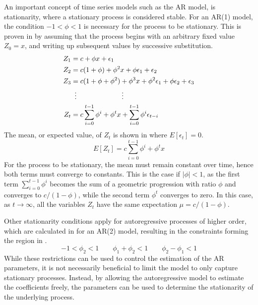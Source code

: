     An important concept of time series models such as the AR model, is stationarity, where a stationary process is considered stable. For an AR(1) model, the condition $-1<\phi<1$ is necessary for the process to be stationary. This is proven in \cite{alonso2012autoregressive} by assuming that the process begins with an arbitrary fixed value $Z_0=x$, and writing up subsequent values by successive substitution.
    \begin{equation}
        \begin{split}
            Z_1 & = c + \phi x + \epsilon_1 \\
            Z_2 & = c(1+\phi) + \phi^2x+\phi\epsilon_1 + \epsilon_2 \\
            Z_3 & = c(1+\phi+\phi^2) + \phi^3x + \phi^2\epsilon_1 + \phi\epsilon_2 + \epsilon_3 \\
            & \vdotswithin{=}\qquad\qquad\qquad \vdots \\
            Z_t & = c\sum_{i=0}^{t-1}\phi^i + \phi^tx + \sum_{i=0}^{t-1}\phi^i\epsilon_{t-i}
        \end{split}
    \end{equation}
    The mean, or expected value, of $Z_t$ is shown in  where $E[\epsilon_t]=0$.
    \begin{equation}\label{eq:ar-expectation}
        E[Z_t] = c\sum_{i=0}^{t-1}\phi^i+\phi^tx
    \end{equation}
    For the process to be stationary, the mean must remain constant over time, hence both terms must converge to constants. This is the case if $|\phi|<1$, as the first term $\sum_{i=0}^{t-1}\phi^i$ becomes the sum of a geometric progression with ratio $\phi$ and converges to $c/(1-\phi)$, while the second term $\phi^t$ converges to zero. In this case, as $t\rightarrow\infty$, all the variables $Z_t$ have the same expectation $\mu=c/(1-\phi)$.
    
    Other stationarity conditions apply for autoregressive processes of higher order, which are calculated in \cite{giles2012stationarity} for an AR(2) model, resulting in the constraints forming the region in .
    \begin{equation}\label{eq:ar-2-constraints}
        -1<\phi_2<1 \qquad \phi_1+\phi_2<1 \qquad \phi_2-\phi_1<1
    \end{equation}
    While these restrictions can be used to control the estimation of the AR parameters, it is not necessarily beneficial to limit the model to only capture stationary processes. Instead, by allowing the autoregressive model to estimate the coefficients freely, the parameters can be used to determine the stationarity of the underlying process.
    
    

